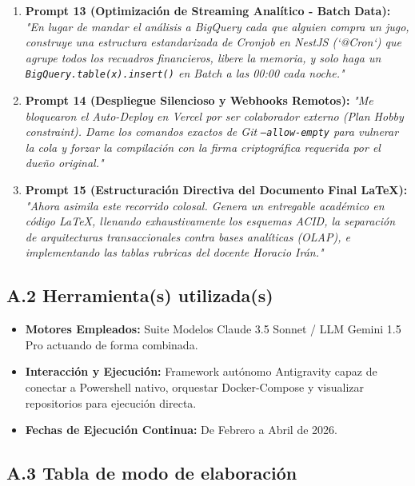 \documentclass[12pt,a4paper]{article}
\begin{document}
\begin{enumerate}
    \item \textbf{Prompt 13 (Optimización de Streaming Analítico - Batch Data):} \textit{"En lugar de mandar el análisis a BigQuery cada que alguien compra un jugo, construye una estructura estandarizada de Cronjob en NestJS (`@Cron`) que agrupe todos los recuadros financieros, libere la memoria, y solo haga un \texttt{BigQuery.table(x).insert()} en Batch a las 00:00 cada noche."}

    \item \textbf{Prompt 14 (Despliegue Silencioso y Webhooks Remotos):} \textit{"Me bloquearon el Auto-Deploy en Vercel por ser colaborador externo (Plan Hobby constraint). Dame los comandos exactos de Git \texttt{--allow-empty} para vulnerar la cola y forzar la compilación con la firma criptográfica requerida por el dueño original."}

    \item \textbf{Prompt 15 (Estructuración Directiva del Documento Final LaTeX):} \textit{"Ahora asimila este recorrido colosal. Genera un entregable académico en código \LaTeX, llenando exhaustivamente los esquemas ACID, la separación de arquitecturas transaccionales contra bases analíticas (OLAP), e implementando las tablas rubricas del docente Horacio Irán."}
\end{enumerate}

\subsection{A.2 Herramienta(s) utilizada(s)}
\begin{itemize}
    \item \textbf{Motores Empleados:} Suite Modelos Claude 3.5 Sonnet / LLM Gemini 1.5 Pro actuando de forma combinada.
    \item \textbf{Interacción y Ejecución:} Framework autónomo Antigravity capaz de conectar a Powershell nativo, orquestar Docker-Compose y visualizar repositorios para ejecución directa.
    \item \textbf{Fechas de Ejecución Continua:} De Febrero a Abril de 2026.
\end{itemize}

\subsection{A.3 Tabla de modo de elaboración}
\end{document}
